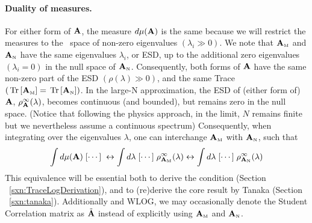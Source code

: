\paragraph{Duality of measures.}
For either form of $\mathbf{A}$, the measure $d\mu(\mathbf{A})$ is the same because we will restrict the measures to the~\ECS
space of non-zero eigenvalues $(\lambda_{i}\gg 0)$.
We note that ${\mathbf{A}}_{\text{\tiny M}}$ and ${\mathbf{A}}_{\text{\tiny N}}$ have the same eigenvalues $\lambda_{i}$, or ESD,
up to the additional zero eigenvalues $(\lambda_{i}=0)$ in the null space of ${\mathbf{A}}_{\text{\tiny N}}$.  
Consequently, both forms of $\mathbf{A}$ have %
the same non-zero part
of the ESD $(\rho(\lambda)\gg 0)$, and the same Trace $(\mbox{}\operatorname{Tr}\left[{\mathbf{A}}_{\text{\tiny M}}\right]=\mbox{}\operatorname{Tr}\left[{\mathbf{A}}_{\text{\tiny N}}\right])$.
In the large-N approximation, the ESD of (either form of)
$\mathbf{A}$, $\rho^{\infty}_{\mathbf{A}}(\lambda)$,
becomes continuous (and bounded), but remains zero in the null space.
(Notice that following the physics approach, in the limit, $N$ remains finite but we nevertheless assume a continuous spectrum)
Consequently,
when integrating over the eigenvalues  $\lambda$, one can interchange
${\mathbf{A}}_{\text{\tiny M}}$  with ${\mathbf{A}}_{\text{\tiny N}}$, such that
\begin{align}
 \int d\mu(\mathbf{A})\;[\cdots]\;\leftrightarrow  \int d\lambda\;[\cdots]\; \rho^{\infty}_{{\mathbf{A}}_{\text{\tiny M}}}(\lambda) \leftrightarrow  \int d\lambda\;[\cdots]\; \rho^{\infty}_{{\mathbf{A}}_{\text{\tiny N}}}(\lambda)
\end{align}
This equivalence will be essential both to derive the \TRACELOG condition (Section ~\ref{sxn:TraceLogDerivation}),
and to (re)derive the core result by Tanaka (Section ~\ref{sxn:tanaka}).
Additionally and WLOG, we may occasionally denote the Student Correlation matrix as
$\tilde{\mathbf{A}}$ instead of explicitly using  ${\mathbf{A}}_{\text{\tiny M}}$ and ${\mathbf{A}}_{\text{\tiny N}}$.

